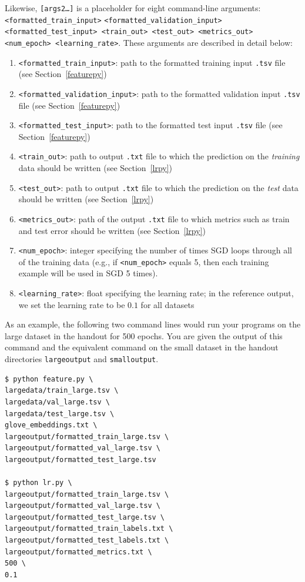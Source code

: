 \documentclass[11pt,addpoints,answers]{exam}
\begin{document}
Likewise, \texttt{[args2\dots]} is a placeholder for eight command-line arguments: \texttt{<formatted\_train\_input>} \texttt{<formatted\_validation\_input> <formatted\_test\_input> <train\_out> <test\_out> <metrics\_out> <num\_epoch> <learning\_rate>}. These arguments are described in detail below:
\begin{enumerate}
    \item \texttt{<formatted\_train\_input>}: path to the formatted training input \texttt{.tsv} file (see Section~\ref{featurepy})
    \item \texttt{<formatted\_validation\_input>}: path to the formatted validation input \texttt{.tsv} file (see Section~\ref{featurepy})
    \item \texttt{<formatted\_test\_input>}: path to the formatted test input \texttt{.tsv} file (see Section~\ref{featurepy})
    \item \texttt{<train\_out>}: path to output \texttt{.txt} file to which the prediction on the \emph{training} data should be written (see Section~\ref{lrpy})
    \item \texttt{<test\_out>}: path to output \texttt{.txt} file to which the prediction on the \emph{test} data should be written (see Section~\ref{lrpy})
    \item \texttt{<metrics\_out>}: path of the output \texttt{.txt} file to which metrics such as train and test error should be written (see Section~\ref{lrpy})
    \item \texttt{<num\_epoch>}: integer specifying the number of times SGD loops through all of the training data (e.g., if \texttt{<num\_epoch>} equals 5, then each training example will be used in SGD 5 times). 
    \item \texttt{<learning\_rate>}: float specifying the learning rate; in the reference output, we set the learning rate to be $0.1$ for all datasets
\end{enumerate}

As an example, the following two command lines would run your programs on the large dataset in the handout for 500 epochs. You are given the output of this command and the equivalent command on the small dataset in the handout directories \verb|largeoutput| and \verb|smalloutput|.

\begin{lstlisting}[language=Shell]
$ python feature.py \ 
largedata/train_large.tsv \
largedata/val_large.tsv \
largedata/test_large.tsv \
glove_embeddings.txt \
largeoutput/formatted_train_large.tsv \
largeoutput/formatted_val_large.tsv \
largeoutput/formatted_test_large.tsv

$ python lr.py \
largeoutput/formatted_train_large.tsv \
largeoutput/formatted_val_large.tsv \
largeoutput/formatted_test_large.tsv \
largeoutput/formatted_train_labels.txt \
largeoutput/formatted_test_labels.txt \
largeoutput/formatted_metrics.txt \
500 \
0.1
\end{lstlisting}
\end{document}
